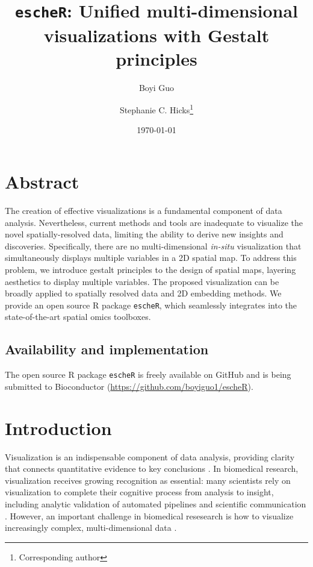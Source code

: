 \documentclass[10pt,twocolumn]{article}
\title{\texttt{escheR}: Unified multi-dimensional visualizations with Gestalt principles}
\author[1]{Boyi Guo}
\author[1,2]{Stephanie C. Hicks\thanks{Corresponding author}}
\affil[1]{Department of Biostatistics, Johns Hopkins Bloomberg School of Public Health, MD, USA}
\affil[2]{Malone Center for Engineering in Healthcare, Johns Hopkins University, MD, USA}
\date{\today}
\newcommand{\fixme}[1]{{\color{red} (#1)}}
\begin{document}
\maketitle

\vspace{-.6in}

\section*{Abstract}
The creation of effective visualizations is a fundamental component of data analysis. Nevertheless, current methods and
tools are inadequate to visualize the novel spatially-resolved data, limiting the ability to derive new insights and discoveries. Specifically, there are no multi-dimensional \textit{in-situ} visualization that simultaneously displays multiple variables in a 2D spatial map. To address this problem, we introduce gestalt principles to the design of spatial maps, layering aesthetics to display multiple variables. The proposed visualization can be broadly applied to spatially resolved data and 2D embedding methods. We provide an open source R package \texttt{escheR}, which seamlessly integrates into the state-of-the-art spatial omics toolboxes.

\subsection*{Availability and implementation}
The open source R package \texttt{escheR} is freely available on GitHub and is being submitted to Bioconductor (\href{https://github.com/boyiguo1/escheR}{https://github.com/boyiguo1/escheR}).


\section{Introduction}
Visualization is an indispensable component of data analysis, providing clarity that connects quantitative evidence to key conclusions \cite{dagostinomcgowan_2022}. In biomedical research, visualization receives growing recognition as essential: many scientists rely on visualization to complete their cognitive process from analysis to insight, including analytic validation of automated pipelines and scientific communication \cite{odonoghue_2021}. However, an important challenge in biomedical resesearch is how to visualize increasingly complex, multi-dimensional data \cite{odonoghue_2010}. 
\end{document}
